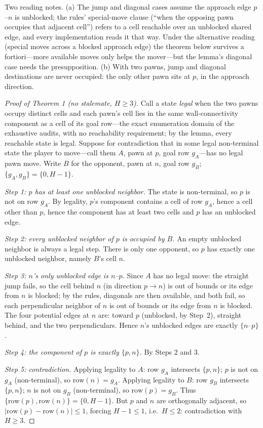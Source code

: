 \documentclass[conference]{IEEEtran}
\begin{document}
Two reading notes. (a) The jump and diagonal cases assume the approach edge $p$--$n$ is unblocked; the rules' special-move clause (``when the opposing pawn occupies that adjacent cell'') refers to a cell reachable over an unblocked shared edge, and every implementation reads it that way. Under the alternative reading (special moves across a blocked approach edge) the theorem below survives a fortiori---more available moves only helps the mover---but the lemma's diagonal case needs the presupposition. (b) With two pawns, jump and diagonal destinations are never occupied: the only other pawn sits at $p$, in the approach direction.

\begin{proof}[Proof of Theorem 1 (no stalemate, $H\geq 3$)]
Call a state \emph{legal} when the two pawns occupy distinct cells and each pawn's cell lies in the same wall-connectivity component as a cell of its goal row---the exact enumeration domain of the exhaustive audits, with no reachability requirement; by the lemma, every reachable state is legal. Suppose for contradiction that in some legal non-terminal state the player to move---call them $A$, pawn at $p$, goal row $g_A$---has no legal pawn move. Write $B$ for the opponent, pawn at $n$, goal row $g_B$; $\{g_A,g_B\}=\{0,H-1\}$.

\emph{Step 1: $p$ has at least one unblocked neighbor.} The state is non-terminal, so $p$ is not on row $g_A$. By legality, $p$'s component contains a cell of row $g_A$, hence a cell other than $p$, hence the component has at least two cells and $p$ has an unblocked edge.

\emph{Step 2: every unblocked neighbor of $p$ is occupied by $B$.} An empty unblocked neighbor is always a legal step. There is only one opponent, so $p$ has exactly one unblocked neighbor, namely $B$'s cell $n$.

\emph{Step 3: $n$'s only unblocked edge is $n$--$p$.} Since $A$ has no legal move: the straight jump fails, so the cell behind $n$ (in direction $p\to n$) is out of bounds or its edge from $n$ is blocked; by the rules, diagonals are then available, and both fail, so each perpendicular neighbor of $n$ is out of bounds or its edge from $n$ is blocked. The four potential edges at $n$ are: toward $p$ (unblocked, by Step~2), straight behind, and the two perpendiculars. Hence $n$'s unblocked edges are exactly $\{n\text{--}p\}$.

\emph{Step 4: the component of $p$ is exactly $\{p,n\}$.} By Steps 2 and 3.

\emph{Step 5: contradiction.} Applying legality to $A$: row $g_A$ intersects $\{p,n\}$; $p$ is not on $g_A$ (non-terminal), so $\mathrm{row}(n)=g_A$. Applying legality to $B$: row $g_B$ intersects $\{p,n\}$; $n$ is not on $g_B$ (non-terminal), so $\mathrm{row}(p)=g_B$. Thus $\{\mathrm{row}(p),\mathrm{row}(n)\}=\{0,H-1\}$. But $p$ and $n$ are orthogonally adjacent, so $|\mathrm{row}(p)-\mathrm{row}(n)|\leq 1$, forcing $H-1\leq 1$, i.e.\ $H\leq 2$: contradiction with $H\geq 3$.
\end{proof}
\end{document}
